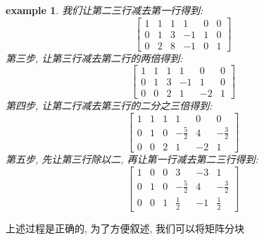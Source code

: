 \documentclass[12pt]{ctexbook}
\numberwithin{definition}{section}
\numberwithin{theorem}{section}
\numberwithin{exercise}{section}
\newtheorem{example}{example}
\numberwithin{example}{section}
\numberwithin{lemma}{section}
\begin{document}
\begin{example}
        我们让第二三行减去第一行得到:
        \begin{equation}
            \begin{bmatrix}
                1 & 1 & 1 & 1 & 0 & 0 \\
                0 & 1 & 3 & -1 & 1 & 0 \\
                0 & 2 & 8 & -1 & 0 & 1
            \end{bmatrix}
        \end{equation}
        第三步, 让第三行减去第二行的两倍得到:
        \begin{equation}
            \begin{bmatrix}
                1 & 1 & 1 & 1 & 0 & 0 \\
                0 & 1 & 3 & -1 & 1 & 0 \\
                0 & 0 & 2 & 1 & -2 & 1
            \end{bmatrix}
        \end{equation}
        第四步, 让第二行减去第三行的二分之三倍得到:
        \begin{equation}
            \begin{bmatrix}
                1 & 1 & 1 & 1 & 0 & 0 \\
                0 & 1 & 0 & -\frac{5}{2} & 4 & -\frac{3}{2} \\
                0 & 0 & 2 & 1 & -2 & 1
            \end{bmatrix}
        \end{equation}
        第五步, 先让第三行除以二, 再让第一行减去第二三行得到:
        \begin{equation}
            \begin{bmatrix}
                1 & 0 & 0 & 3 & -3 & 1 \\
                0 & 1 & 0 & -\frac{5}{2} & 4 & -\frac{3}{2} \\
                0 & 0 & 1 & \frac{1}{2} & -1 & \frac{1}{2}
            \end{bmatrix}
        \end{equation}
    \end{example}

    上述过程是正确的, 为了方便叙述, 我们可以将矩阵分块
    
\end{document}

